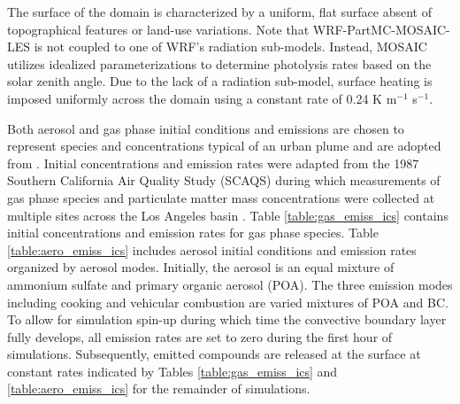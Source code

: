 \documentclass[journal abbreviation, manuscript]{copernicus}
\begin{document}
The surface of the domain is characterized by a uniform, flat surface absent of topographical features or land-use variations. Note that WRF-PartMC-MOSAIC-LES is not coupled to one of WRF's radiation sub-models. Instead,  
MOSAIC utilizes idealized parameterizations to determine photolysis rates based on the solar zenith angle. Due to the lack of a radiation sub-model, surface heating is imposed uniformly across the domain using a constant rate of 0.24 K m$^{-1}$ s$^{-1}$. 

Both aerosol and gas phase initial conditions and emissions are chosen to represent species and concentrations typical of an urban plume and are adopted from \citet{riemer_simulating_2009}. Initial concentrations and emission rates were adapted from the 1987 Southern California Air Quality Study (SCAQS) during which measurements of gas phase species and particulate matter mass concentrations were collected at multiple sites across the Los Angeles basin \citep{zaveri_model_2008}. Table \ref{table:gas_emiss_ics} contains initial concentrations and emission rates for gas phase species. Table \ref{table:aero_emiss_ics} includes aerosol initial conditions and emission rates organized by aerosol modes. Initially, the aerosol is an equal mixture of ammonium sulfate and primary organic aerosol (POA). The three emission modes including cooking and vehicular combustion are varied mixtures of POA and BC. To allow for simulation spin-up during which time the convective boundary layer fully develops, all emission rates are set to zero during the first hour of simulations. Subsequently, emitted compounds are released at the surface at constant rates indicated by Tables \ref{table:gas_emiss_ics} and \ref{table:aero_emiss_ics} for the remainder of simulations.
\end{document}
